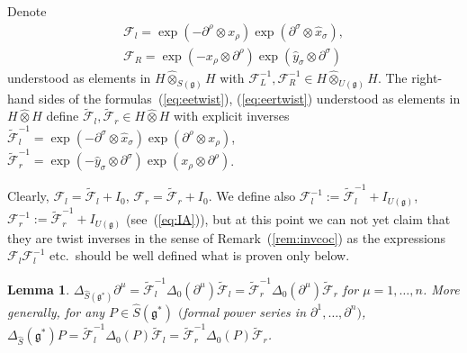 \documentclass[pdftex]{sigma}
\def\gg{\mathfrak{g}}
\def\hx{\hat{x}}
\def\hy{\hat{y}}
\newtheorem{Lemma}[Theorem]{Lemma}
\numberwithin{equation}{section}
\begin{document}
\begin{Definition} Denote
\begin{gather}\label{eq:eetwist}
\mathcal{F}_l = \exp(-\partial^\rho\otimes x_\rho)\exp(\partial^\sigma\otimes\hx_\sigma),\\
\label{eq:eertwist}
\mathcal{F}_R = \exp(-x_\rho\otimes\partial^\rho) \exp(\hy_\sigma\otimes\partial^\sigma)
\end{gather}
understood as elements in $H\hat\otimes_{S(\gg)} H$ with $\mathcal{F}^{-1}_L, \mathcal{F}^{-1}_R\in H\hat\otimes_{U(\gg)}H$. The right-hand sides of the formulas~(\ref{eq:eetwist}), (\ref{eq:eertwist}) understood as elements in $H\hat\otimes H$ define $\tilde{\mathcal{F}}_l,\tilde{\mathcal{F}}_r\in H\hat\otimes H$ with explicit inverses $\tilde{\mathcal{F}}_l^{-1} = \exp(-\partial^\sigma\otimes\hx_\sigma)\exp(\partial^\rho\otimes x_\rho)$, $\tilde{\mathcal{F}}_r^{-1} = \exp(-\hy_\sigma\otimes\partial^\sigma)\exp(x_\rho\otimes\partial^\rho)$.
\end{Definition}

Clearly, $\mathcal{F}_l = \tilde{\mathcal{F}}_l+I_0$, $\mathcal{F}_r = \tilde{\mathcal{F}}_r+I_0$. We define also $\mathcal{F}_l^{-1} := \tilde{\mathcal{F}}_l^{-1}+I_{U(\gg)}$, $\mathcal{F}_r^{-1} := \tilde{\mathcal{F}}_r^{-1}+I_{U(\gg)}$ (see~(\ref{eq:IA})), but at this point we can not yet claim that they are twist inverses in the sense of Remark~(\ref{rem:invcoc}) as the expressions $\mathcal{F}_l\mathcal{F}_l^{-1}$ etc.\ should be well defined what is proven only below.

\begin{Lemma}\label{lem:DeltaFd}
$\Delta_{\hat{S}(\gg^*)}\partial^\mu = \tilde{\mathcal{F}}_l^{-1}\Delta_0(\partial^\mu)\tilde{\mathcal{F}}_l = \tilde{\mathcal{F}}_r^{-1}\Delta_0(\partial^\mu)\tilde{\mathcal{F}}_r$ for $\mu = 1,\dots, n$. More generally, for any $P\in\hat{S}(\gg^*)$ $($formal power series in $\partial^1,\dots,\partial^n)$, $\Delta_{\hat{S}}(\gg^*) P = \tilde{\mathcal{F}}_l^{-1}\Delta_0(P)\tilde{\mathcal{F}}_l = \tilde{\mathcal{F}}_r^{-1}\Delta_0(P)\tilde{\mathcal{F}}_r$.
\end{Lemma}
\end{document}
